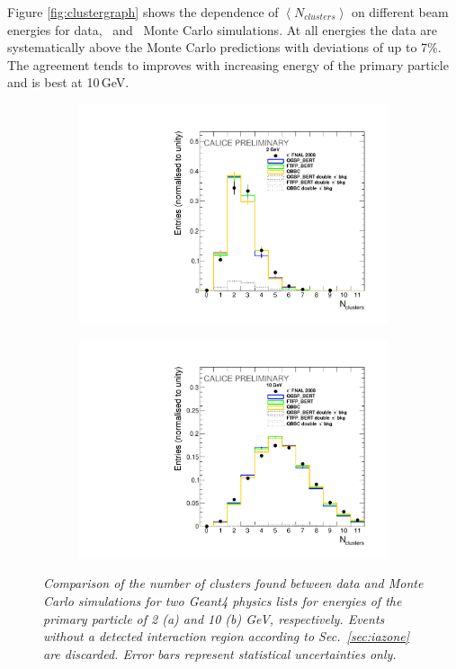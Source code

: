 Figure \ref{fig:clustergraph} shows the dependence of $\left<N_{clusters}\right>$  on different beam energies for data, \ftfp\ and \qgsp\ Monte Carlo simulations. At all energies the data are systematically above the Monte Carlo predictions with deviations of up to 7\%. The agreement tends to improves with increasing energy of the primary particle and is best at 10\,GeV. 
\begin{figure}[H]
	\centering
	\begin{subfigure}{0.5\textwidth}
		\centering
		\includegraphics[width=.90\linewidth]{ECAL/plots/cluster-2.pdf}
		\caption{\label{fig:cl2} }
	\end{subfigure}%
	\begin{subfigure}{0.5\textwidth}
		\centering
		\includegraphics[width=.90\linewidth]{ECAL/plots/cluster-10.pdf}
		\caption{\label{fig:cl10} }
	\end{subfigure}
	\caption{\label{fig:clusterexample} \sl Comparison of the number of clusters found between data and Monte Carlo simulations for two {\sc Geant}4 physics lists for energies of the primary particle of 2 (a) and 10 (b) GeV, respectively. Events without a detected interaction region according to Sec.~\ref{sec:iazone} are discarded. Error bars represent statistical uncertainties only.}
\end{figure}

